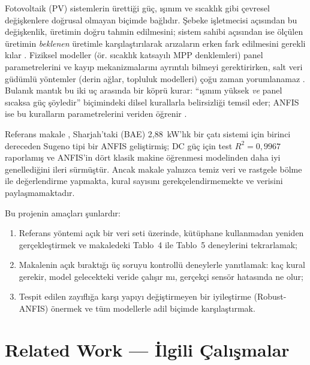 \documentclass[11pt,a4paper]{article}
\begin{document}
Fotovoltaik (PV) sistemlerin ürettiği güç, ışınım ve sıcaklık gibi çevresel değişkenlere doğrusal olmayan biçimde bağlıdır. Şebeke işletmecisi açısından bu değişkenlik, üretimin doğru tahmin edilmesini; sistem sahibi açısından ise ölçülen üretimin \emph{beklenen} üretimle karşılaştırılarak arızaların erken fark edilmesini gerekli kılar \cite{salameh2025,gaboitaolelwe2023}. Fiziksel modeller (ör. sıcaklık katsayılı MPP denklemleri) panel parametrelerini ve kayıp mekanizmalarını ayrıntılı bilmeyi gerektirirken, salt veri güdümlü yöntemler (derin ağlar, topluluk modelleri) çoğu zaman yorumlanamaz \cite{gaboitaolelwe2023}. Bulanık mantık bu iki uç arasında bir köprü kurar: “ışınım yüksek \emph{ve} panel sıcaksa güç şöyledir” biçimindeki dilsel kurallarla belirsizliği temsil eder; ANFIS ise bu kuralların parametrelerini veriden öğrenir \cite{jang1993}.

Referans makale \cite{salameh2025}, Sharjah'taki (BAE) 2,88~kW'lık bir çatı sistemi için birinci dereceden Sugeno tipi bir ANFIS geliştirmiş; DC güç için test $R^2=0{,}9967$ raporlamış ve ANFIS'in dört klasik makine öğrenmesi modelinden daha iyi genellediğini ileri sürmüştür. Ancak makale yalnızca temiz veri ve rastgele bölme ile değerlendirme yapmakta, kural sayısını gerekçelendirmemekte ve verisini paylaşmamaktadır.

Bu projenin amaçları şunlardır:
\begin{enumerate}[label=(\arabic*)]
\item Referans yöntemi açık bir veri seti üzerinde, kütüphane kullanmadan yeniden gerçekleştirmek ve makaledeki Tablo~4 ile Tablo~5 deneylerini tekrarlamak;
\item Makalenin açık bıraktığı üç soruyu kontrollü deneylerle yanıtlamak: kaç kural gerekir, model gelecekteki veride çalışır mı, gerçekçi sensör hatasında ne olur;
\item Tespit edilen zayıflığa karşı yapıyı değiştirmeyen bir iyileştirme (Robust-ANFIS) önermek ve tüm modellerle adil biçimde karşılaştırmak.
\end{enumerate}

\section{Related Work — İlgili Çalışmalar}
\end{document}
